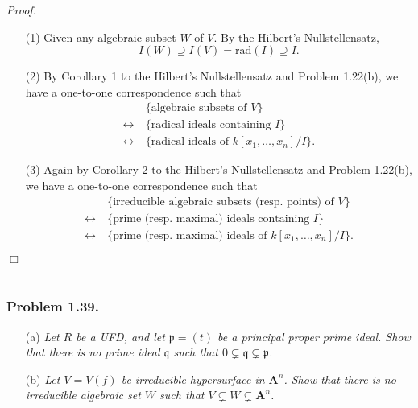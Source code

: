 \documentclass{article}
\begin{document}
\emph{Proof.}
\begin{enumerate}
\item[(1)]
  Given any algebraic subset $W$ of $V$.
  By the Hilbert's Nullstellensatz,
  \[
    I(W) \supseteq I(V) = \mathrm{rad}(I) \supseteq I.
  \]

\item[(2)]
  By Corollary 1 to the Hilbert's Nullstellensatz and Problem 1.22(b),
  we have a one-to-one correspondence such that
  \begin{align*}
    &\: \{ \text{algebraic subsets of $V$} \} \\
    \longleftrightarrow&\:
    \{ \text{radical ideals containing $I$} \} \\
    \longleftrightarrow&\:
    \{ \text{radical ideals of $k[x_1,\ldots,x_n]/I$} \}.
  \end{align*}

\item[(3)]
  Again
  by Corollary 2 to the Hilbert's Nullstellensatz and Problem 1.22(b),
  we have a one-to-one correspondence such that
  \begin{align*}
    &\: \{ \text{irreducible algebraic subsets (resp. points) of $V$} \} \\
    \longleftrightarrow&\:
    \{ \text{prime (resp. maximal) ideals containing $I$} \} \\
    \longleftrightarrow&\:
    \{ \text{prime (resp. maximal) ideals of $k[x_1,\ldots,x_n]/I$} \}.
  \end{align*}
\end{enumerate}
$\Box$ \\\\






\subsubsection*{Problem 1.39.}
\begin{enumerate}
\item[(a)]
  \emph{Let $R$ be a UFD, and let $\mathfrak{p} = (t)$ be a principal proper prime ideal.
  Show that there is no prime ideal $\mathfrak{q}$
  such that $0 \subsetneq \mathfrak{q} \subsetneq \mathfrak{p}$.}

\item[(b)]
  \emph{Let $V = V(f)$ be irreducible hypersurface in $\mathbf{A}^n$.
  Show that there is no irreducible algebraic set $W$ such that
  $V \subsetneq W \subsetneq \mathbf{A}^n$.} \\
\end{enumerate}
\end{document}
